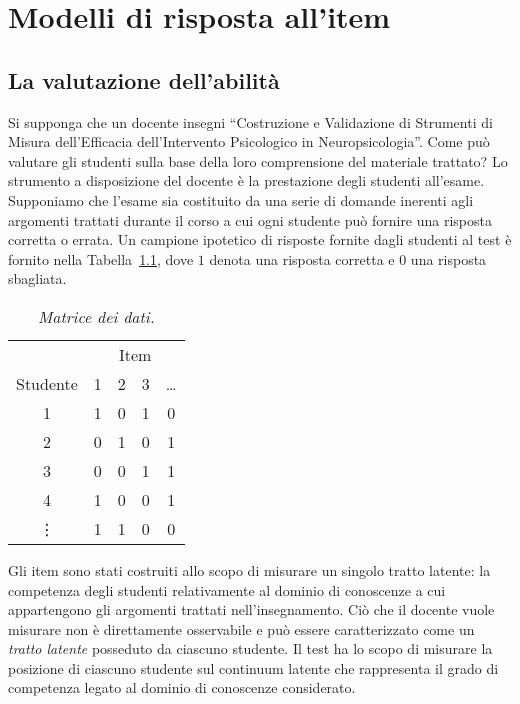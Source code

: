 \chapter{Modelli di risposta all'item}
\label{chapter:irt} 

\section{La valutazione dell'abilità}

Si supponga che un docente insegni ``Costruzione e Validazione di Strumenti di Misura dell'Efficacia dell'Intervento Psicologico in Neuropsicologia''. 
Come può valutare gli studenti sulla base della loro comprensione del materiale trattato?  
Lo strumento a disposizione del docente è la prestazione degli studenti all'esame.  
Supponiamo che l'esame sia costituito da una serie di domande inerenti agli argomenti trattati durante il corso a cui ogni studente può fornire una risposta   corretta o errata. 
Un campione ipotetico di risposte fornite dagli studenti al test è fornito nella Tabella~\ref{tab_data_lsat}, dove $1$ denota una risposta corretta e $0$ una risposta sbagliata.  

\begin{table}[h!]
\caption{\textit{Matrice dei dati.} }
\label{tab_data_lsat}
\centering
\begin{tabular}{ccccc}
\toprule
&\multicolumn{4}{c}{Item} \\
\cmidrule(r){2-5}
Studente &  1  &   2 &   3  & \dots \\
\midrule
1     &  1   &   0   &   1  & 0 \\
2     &  0   &   1   &   0 & 1 \\
3     &  0   &   0  &   1  & 1\\
4     &  1   &   0   &   0 & 1 \\
\vdots &  1   &   1   &   0 & 0  \\
\bottomrule
\end{tabular}
\end{table}

Gli item sono stati costruiti allo scopo di misurare un singolo tratto latente: la competenza degli studenti relativamente al dominio di conoscenze a cui appartengono gli argomenti trattati nell'insegnamento. 
Ciò che il docente vuole misurare non è direttamente osservabile e può essere caratterizzato come un \emph{tratto latente} posseduto da ciascuno studente.  
Il test ha lo scopo di misurare la posizione di ciascuno studente sul continuum latente che rappresenta il grado di  competenza legato al dominio di conoscenze considerato.

